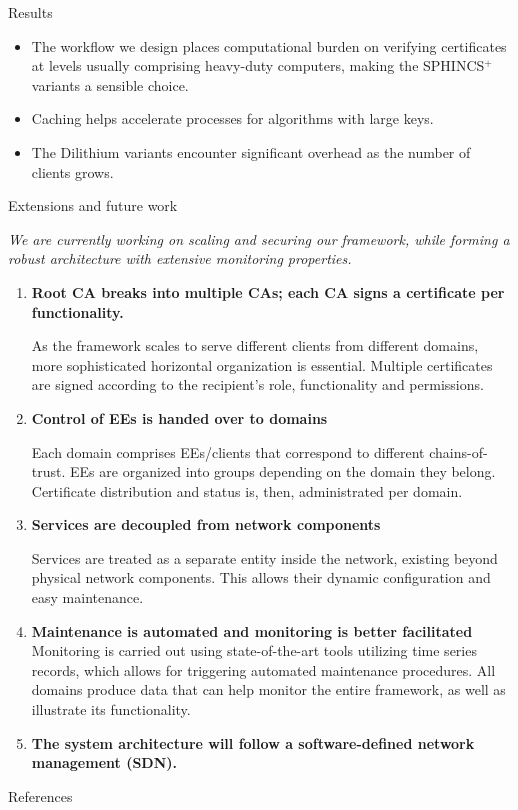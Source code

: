 \documentclass[10pt]{beamer}
\begin{document}
\begin{frame}[allowframebreaks]{Results}
	\break

	\begin{itemize}
		\item The workflow we design places computational burden on verifying certificates at levels usually comprising heavy-duty computers, making the SPHINCS$^+$ variants a sensible choice.
		\item Caching helps accelerate processes for algorithms with large keys.
		\item The Dilithium variants encounter significant overhead  as the number of clients grows.
	\end{itemize}
\end{frame}
\begin{frame}[allowframebreaks]{Extensions and future work}
	
	\emph{We are currently working on scaling and securing our framework, while forming a robust architecture with extensive monitoring properties.}
	
	\medskip
	
	\begin{enumerate}
		\item \textbf{Root CA breaks into multiple CAs; each CA signs a certificate per functionality.}
		
		As the framework scales to serve different clients from different domains, more sophisticated horizontal organization is essential. Multiple certificates are signed according to the recipient's role, functionality and permissions.
		\hfill\break
		
		\item \textbf{Control of EEs is handed over to domains}
		
		Each domain comprises EEs/clients that correspond to different chains-of-trust. EEs are organized into groups depending on the domain they belong. Certificate distribution and status is, then, administrated per domain.
		
		\break
		\item \textbf{Services are decoupled from network components}
		
		Services are treated as a separate entity inside the network, existing beyond physical network components. This allows their dynamic configuration and easy maintenance.
		\hfill\break
		
		\item \textbf{Maintenance is automated and monitoring is better facilitated}
		Monitoring is carried out using state-of-the-art tools utilizing time series records, which allows for triggering automated maintenance procedures. All domains produce data that can help monitor the entire framework, as well as illustrate its functionality. 
		\hfill\break
		
		\item \textbf{The system architecture will follow a software-defined network management (SDN).}
	\end{enumerate}
\end{frame}
\begin{frame}[allowframebreaks]{References}
	
\end{frame}
\end{document}
